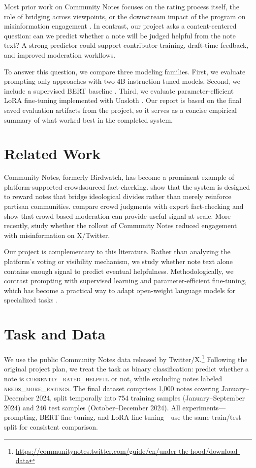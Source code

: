\documentclass[11pt]{article}
\begin{document}
	Most prior work on Community Notes focuses on the rating process itself, the role of bridging across viewpoints, or the downstream impact of the program on misinformation engagement \citep{allen2022,chuai2024}. In contrast, our project asks a content-centered question: can we predict whether a note will be judged helpful from the note text? A strong predictor could support contributor training, draft-time feedback, and improved moderation workflows.
	
	To answer this question, we compare three modeling families. First, we evaluate prompting-only approaches with two 4B instruction-tuned models. Second, we include a supervised BERT baseline \citep{devlin2019bert}. Third, we evaluate parameter-efficient LoRA fine-tuning \citep{hu2022lora} implemented with Unsloth \citep{unsloth2024}. Our report is based on the final saved evaluation artifacts from the project, so it serves as a concise empirical summary of what worked best in the completed system.
	
	\section{Related Work}
	Community Notes, formerly Birdwatch, has become a prominent example of platform-supported crowdsourced fact-checking. \citet{allen2022} show that the system is designed to reward notes that bridge ideological divides rather than merely reinforce partisan communities. \citet{saeed2022} compare crowd judgments with expert fact-checking and show that crowd-based moderation can provide useful signal at scale. More recently, \citet{chuai2024} study whether the rollout of Community Notes reduced engagement with misinformation on X/Twitter.
	
	Our project is complementary to this literature. Rather than analyzing the platform's voting or visibility mechanism, we study whether note text alone contains enough signal to predict eventual helpfulness. Methodologically, we contrast prompting with supervised learning and parameter-efficient fine-tuning, which has become a practical way to adapt open-weight language models for specialized tasks \citep{hu2022lora}.
	
	\section{Task and Data}
	We use the public Community Notes data released by Twitter/X.\footnote{\begin{minipage}{\columnwidth}\small\url{https://communitynotes.twitter.com/guide/en/under-the-hood/download-data}\end{minipage}} Following the original project plan, we treat the task as binary classification: predict whether a note is \textsc{currently\_rated\_helpful} or not, while excluding notes labeled \textsc{needs\_more\_ratings}. The final dataset comprises 1,000 notes covering January--December 2024, split temporally into 754 training samples (January--September 2024) and 246 test samples (October--December 2024). All experiments---prompting, BERT fine-tuning, and LoRA fine-tuning---use the same train/test split for consistent comparison.
\end{document}
